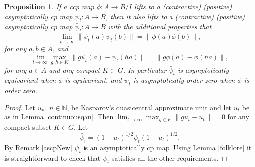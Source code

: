 \documentclass{article}%
\newtheorem{proposition}[theorem]{Proposition}
\begin{document}
\begin{proposition}\label{equivariant} If a ccp map $\phi: A \to B/I$ lifts to a (contractive) (positive) asymptotically cp map $\psi_t: A \to B$, then it also lifts to a (contractive) (positive) asymptotically cp map $\bar\psi_t: A \to B$ with the additional properties that
$$\lim_{t\to \infty}\|\bar \psi_t(a)\bar \psi_t(b)\| = \|\phi(a)\phi(b)\|, $$ for any $a, b \in A$, and
$$\lim_{t\to \infty} \max_{g, h \in K}\|g\bar\psi_t(a)-\bar\psi_t(ha)\| = \|g\phi(a)-\phi(ha)\|,$$ for any $a\in A$ and any compact $K\subset G$.
In particular $\bar\psi_t$ is asymptotically equivariant when $\phi$ is equivariant, and $\bar\psi_t$ is asymptotically order zero  when $\phi$ is order zero.
\end{proposition}
\begin{proof}








Let $u_n$, $n\in \mathbb N$, be Kasparov's quasicentral approximate unit and let $u_t$ be as in Lemma \ref{continuousqau}. Then $\lim_{t\to \infty} \max_{g\in K}\|gu_t - u_t \|= 0$ for any compact subset  $K\in G$. Let $$\bar \psi_{t} = (1-u_t)^{1/2} \psi_t (1-u_t)^{1/2}.$$ By Remark \ref{ascpNew} $\psi_t$ is an asymptotically cp map. Using Lemma \ref{folklore} it is straightforward to check that $\psi_t$ satisfies all the other requirements.
\end{proof}
\end{document}
